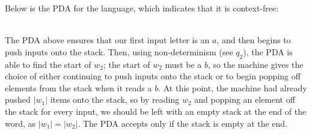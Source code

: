 \documentclass{article}
\begin{document}
\noindent Below is the PDA for the language, which indicates that it is context-free:
\begin{figure}[ht]
   \centering
\end{figure}

\\The PDA above ensures that our first input letter is an \(a\), and then begins to push inputs onto the stack. Then, using non-determinism (see \(q_2\)), the PDA is able to find the start of \(w_2\); the start of \(w_2\) must be a \(b\), so the machine gives the choice of either continuing to push inputs onto the stack or to begin popping off elements from the stack when it reads a \(b\). At this point, the machine had already pushed \(|w_1|\) items onto the stack, so by reading \(w_2\) and popping an element off the stack for every input, we should be left with an empty stack at the end of the word, as \(|w_1| = |w_2|\). The PDA accepts only if the stack is empty at the end.
\\\\

\newpage
\end{document}
